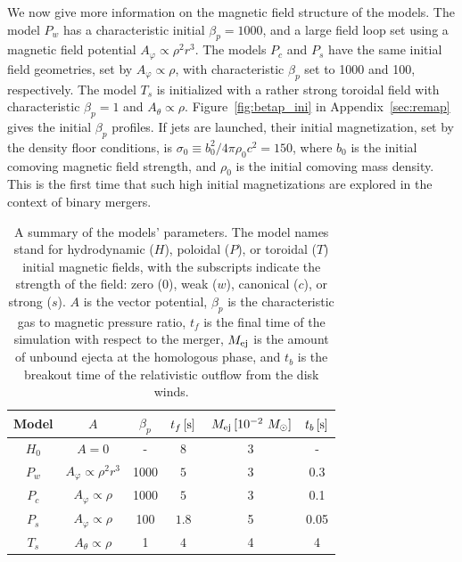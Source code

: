 \documentclass[twocolumn,dvipsnames]{aastex62}
\newcommand{\mej}{\,{M_{\rm ej}}}
\newcommand{\msun}{\,{M_{\odot}}}
\begin{document}
We now give more information on the magnetic field structure of the models. The model $P_w$ has a characteristic initial $\beta_p = 1000$, and a large field loop set using a magnetic field potential $A_\varphi \propto \rho^2 r^3$. The models $P_c$ and $P_s$ have the same initial field geometries, set by $A_\varphi \propto \rho$, with characteristic $\beta_p$ set to 1000 and 100, respectively. The model $T_s$ is initialized with a rather strong toroidal field with characteristic $\beta_p = 1$ and $A_\theta \propto \rho$. Figure~\ref{fig:betap_ini} in Appendix~\ref{sec:remap} gives the initial $ \beta_p $ profiles. If jets are launched, their initial magnetization, set by the density floor conditions, is $ \sigma_0 \equiv b_0^2/4\pi\rho_0 c^2 = 150 $, where $ b_0 $ is the initial comoving magnetic field strength, and $ \rho_0 $ is the initial comoving mass density. This is the first time that such high initial magnetizations are explored in the context of binary mergers.

	\begin{table}
		\setlength{\tabcolsep}{6.2pt}
		\centering
		\renewcommand{\arraystretch}{1.2}
		\begin{tabular}{| c | c c c | c c | }
			
                \hline
			Model & $ A $ & $ \beta_p $ & $ t_f\,[{\rm s}] $ & $ \mej\,[10^{-2}\,\msun] $ & $ t_b\,[{\rm s}] $
			\\	\hline
			$ H_0 $ & $ A = 0 $ & - & $ 8 $ & 3 & - \\ %
			$ P_w $ & $ A_\varphi \propto \rho^2r^3 $ & 1000 & $ 5 $ & 3 & 0.3\\ %
			$ P_c $ & $ A_\varphi \propto \rho $ & 1000 & $ 5 $ & 3 & 0.1 \\   %
			$ P_s $ & $ A_\varphi \propto \rho $ & 100 & $ 1.8 $ & 5 & 0.05\\   %
			$ T_s $ & $ A_\theta \propto \rho $ & 1 & $ 4 $ & 4 & 4 \\ %
                \hline
		\end{tabular}
		
		\caption{
			A summary of the models' parameters. The model names stand for hydrodynamic ($H$), poloidal ($P$), or toroidal ($T$) initial magnetic fields, with the subscripts indicate the strength of the field: zero ($0$), weak ($w$), canonical ($c$), or strong ($s$). $ A $ is the vector potential, $ \beta_p $ is the characteristic gas to magnetic pressure ratio, $ t_f $ is the final time of the simulation with respect to the merger, $ M_{\rm ej} $ is the amount of unbound ejecta at the homologous phase, and $ t_b $ is the breakout time of the relativistic outflow from the disk winds.
    		}
    		\label{tab:models}
	\end{table}
\end{document}
